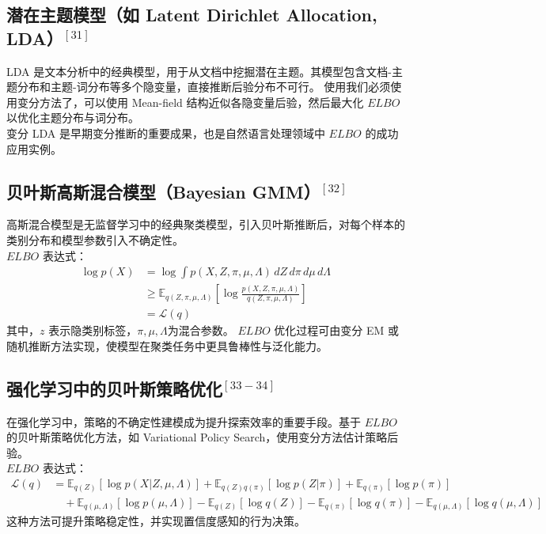 \documentclass[final]{ws-ijseke}
\begin{document}
\subsection{潜在主题模型（如 Latent Dirichlet Allocation, LDA）$^{[31]}$}
\hspace*{2em}LDA 是文本分析中的经典模型，用于从文档中挖掘潜在主题。其模型包含文档-主题分布和主题-词分布等多个隐变量，直接推断后验分布不可行。
使用我们必须使用变分方法了，可以使用 Mean-field 结构近似各隐变量后验，然后最大化 $ELBO$ 以优化主题分布与词分布。\\
\hspace*{2em}变分 LDA 是早期变分推断的重要成果，也是自然语言处理领域中 $ELBO$ 的成功应用实例。
\subsection{贝叶斯高斯混合模型（Bayesian GMM）$^{[32]}$}
\hspace*{2em}高斯混合模型是无监督学习中的经典聚类模型，引入贝叶斯推断后，对每个样本的类别分布和模型参数引入不确定性。\\
$ELBO$ 表达式：
\begin{align*}
\log p(X)
&= \log \int p(X, Z, \pi, \mu, \Lambda) \, dZ \, d\pi \, d\mu \, d\Lambda \\
&\geq \mathbb{E}_{q(Z, \pi, \mu, \Lambda)} \left[ \log \frac{p(X, Z, \pi, \mu, \Lambda)}{q(Z, \pi, \mu, \Lambda)} \right] \\
&= \mathcal{L}(q)
\end{align*}
\hspace*{2em}其中，$z$ 表示隐类别标签，$\pi, \mu, \Lambda$为混合参数。
$ELBO$ 优化过程可由变分 EM 或随机推断方法实现，使模型在聚类任务中更具鲁棒性与泛化能力。

\subsection{强化学习中的贝叶斯策略优化$^{[33-34]}$}
\hspace*{2em}在强化学习中，策略的不确定性建模成为提升探索效率的重要手段。基于 $ELBO$ 的贝叶斯策略优化方法，如 Variational Policy Search，使用变分方法估计策略后验。\\
$ELBO$ 表达式：
\begin{align*}
\mathcal{L}(q)
&= \mathbb{E}_{q(Z)}[\log p(X | Z, \mu, \Lambda)]
+ \mathbb{E}_{q(Z)q(\pi)}[\log p(Z | \pi)]
+ \mathbb{E}_{q(\pi)}[\log p(\pi)] \\
&\quad + \mathbb{E}_{q(\mu, \Lambda)}[\log p(\mu, \Lambda)]
- \mathbb{E}_{q(Z)}[\log q(Z)]
- \mathbb{E}_{q(\pi)}[\log q(\pi)]
- \mathbb{E}_{q(\mu, \Lambda)}[\log q(\mu, \Lambda)]
\end{align*}
这种方法可提升策略稳定性，并实现置信度感知的行为决策。\\\\\\
\end{document}
